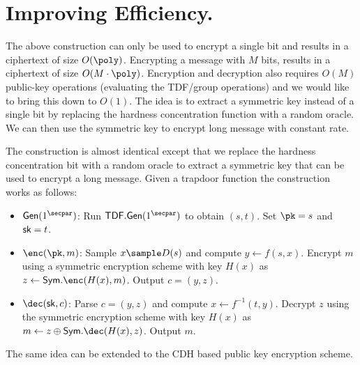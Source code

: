 \documentclass[12pt]{tufte-book}
\newcommand{\gen}{\mathsf{Gen}}
\begin{document}
\section{Improving Efficiency.}
The above construction can only be used to encrypt a single bit and results in a ciphertext of size $O(\poly)$. Encrypting a message with $M$ bits, results in a ciphertext of size $O(M \cdot \poly)$. Encryption and decryption also requires $O(M)$ public-key operations (evaluating the TDF/group operations) and we would like to bring this down to $O(1)$. The idea is to extract a symmetric key instead of a single bit by replacing the hardness concentration function with a random oracle. We can then use the symmetric key to encrypt long message with constant rate.

The construction is almost identical except that we replace the hardness concentration bit with a random oracle to extract a symmetric key that can be used to encrypt a long message. Given a trapdoor function the construction works as follows:
\begin{itemize}
    \item $\gen(1^\secpar)$: Run $\mathsf{TDF}.\gen(1^\secpar)$ to obtain $(s,t)$. Set $\pk = s$ and $\mathsf{sk} = t$.
    \item $\enc(\pk, m)$: Sample $x \sample D(s)$ and compute $y \gets f(s, x)$. Encrypt $m$ using a symmetric encryption scheme with key $H(x)$ as $z \gets \mathsf{Sym}.\enc(H(x), m)$. Output $c = (y, z)$.
    \item $\dec(\sk, c)$: Parse $c = (y, z)$ and compute $x \gets f^{-1}(t, y)$. Decrypt $z$ using the symmetric encryption scheme with key $H(x)$ as $m \gets z \oplus \mathsf{Sym}.\dec(H(x), z)$. Output $m$.
\end{itemize}
The same idea can be extended to the CDH based public key encryption scheme.
\end{document}

